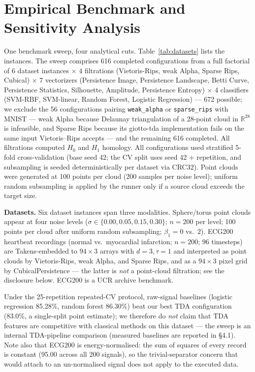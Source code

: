 \documentclass[12pt, a4paper]{report}
\newcommand{\Betti}{\beta}
\theoremstyle{definition}
\theoremstyle{plain}
\theoremstyle{remark}
\begin{document}
\chapter{Empirical Benchmark and Sensitivity Analysis}
\label{chap:results}

One benchmark sweep, four analytical cuts. Table~\ref{tab:datasets}
lists the instances. The sweep comprises
616 completed configurations from a full factorial of 6 dataset
instances $\times$ 4 filtrations (Vietoris-Rips, weak Alpha, Sparse Rips,
Cubical) $\times$ 7 vectorizers (Persistence Image, Persistence
Landscape, Betti Curve, Persistence Statistics, Silhouette, Amplitude,
Persistence Entropy) $\times$ 4 classifiers (SVM-RBF, SVM-linear,
Random Forest, Logistic Regression) --- 672 possible; we exclude the
56 configurations pairing \texttt{weak\_alpha} or
\texttt{sparse\_rips} with MNIST --- weak Alpha because Delaunay
triangulation of a 28-point cloud in $\mathbb{R}^{28}$ is infeasible,
and Sparse Rips because its giotto-tda implementation fails on the
same input Vietoris--Rips accepts --- and the remaining 616
completed. All
filtrations computed $H_0$ and $H_1$ homology. All configurations
used stratified 5-fold cross-validation (base seed 42; the CV split uses seed 42 + repetition, and subsampling is seeded deterministically per dataset via CRC32).
Point clouds were generated at 100 points per cloud (200 samples
per noise level); uniform random subsampling is applied by the runner
only if a source cloud exceeds the target size.

\noindent\textbf{Datasets.} Six dataset instances span three modalities.
Sphere/torus point clouds appear at four noise levels
($\sigma \in \{0.00, 0.05, 0.15, 0.30\}$; $n=200$ per level;
100 points per cloud after uniform random subsampling; $\Betti_1 = 0$ vs.\ $2$).
ECG200 heartbeat recordings (normal vs.\ myocardial infarction;
$n=200$; 96 timesteps) are Takens-embedded to $94 \times 3$ arrays
with $d=3, \tau=1$ and interpreted as point clouds by Vietoris-Rips,
weak Alpha, and Sparse Rips, and as a $94 \times 3$ pixel grid by
CubicalPersistence --- the latter is \emph{not} a point-cloud
filtration; see the disclosure below. ECG200 is a UCR archive
benchmark.

Under the 25-repetition repeated-CV protocol, raw-signal baselines
(logistic regression 85.28\%, random forest 86.30\%) beat our best
TDA configuration (83.0\%, a single-split point estimate); we therefore do \emph{not} claim that
TDA features are competitive with classical methods on this dataset
--- the sweep is an internal TDA-pipeline comparison (measured
baselines are reported in \S4.1). Note also that ECG200 is
energy-normalised: the sum of squares of every record is constant
(95.00 across all 200 signals), so the trivial-separator concern
that would attach to an un-normalised signal does not apply to the
executed data.
\end{document}
